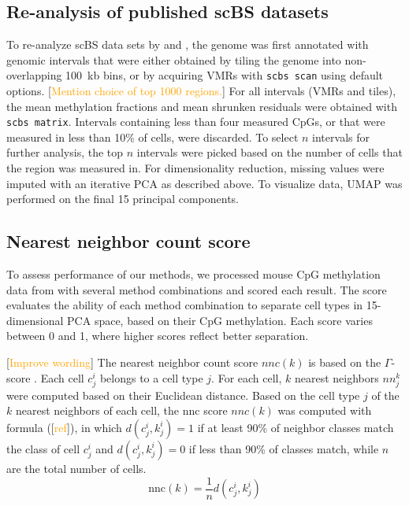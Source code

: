 \documentclass[twocolumn,10pt]{article}
\newcommand{\todo}[1]{[\textcolor{orange}{#1}]}
\begin{document}
\subsection{Re-analysis of published scBS datasets}
To re-analyze scBS data sets by \citet{luo2017single} and \citet{argelaguet2019gastru}, the genome was first annotated with genomic intervals that were either obtained by tiling the genome into non-overlapping 100~kb bins, or by acquiring VMRs with \texttt{scbs scan} using default options. \todo{Mention choice of top 1000 regions.} For all intervals (VMRs and tiles), the mean methylation fractions and mean shrunken residuals were obtained with \texttt{scbs matrix}. Intervals containing less than four measured CpGs, or that were measured in less than 10\% of cells, were discarded. To select $n$ intervals for further analysis, the top $n$ intervals were picked based on the number of cells that the region was measured in. 
For dimensionality reduction, missing values were imputed with an iterative PCA as described above. To visualize data, UMAP was performed on the final 15 principal components.

\subsection{Nearest neighbor count score}
To assess performance of our methods, we processed mouse CpG methylation data from \citet{luo2017single} with several method combinations and scored each result. The score evaluates the ability of each method combination to separate cell types in 15-dimensional PCA space, based on their CpG methylation. Each score varies between 0 and 1, where higher scores reflect better separation.

\todo{Improve wording} The nearest neighbor count score $nnc(k)$ is based on the $\Gamma$-score \citep{Kireeva_2014}. Each cell $c_j^i$ belongs to a cell type $j$. For each cell, $k$ nearest neighbors $nn_j^k$ were computed based on their Euclidean distance. Based on the cell type $j$ of the $k$ nearest neighbors of each cell, the nnc score $nnc(k)$ was computed with formula (\todo{ref}), in which $d(c_j^i, k_j^i)=1$ if at least 90\% of neighbor classes match the class of cell $c_j^i$ and $d(c_j^i, k_j^i)=0$ if less than 90\% of classes match, while $n$ are the total number of cells.
\begin{equation}
    \text{nnc}(k) = \frac{1}{n}d(c_j^i, k_j^i)
\end{equation}

{\small }
\end{document}
